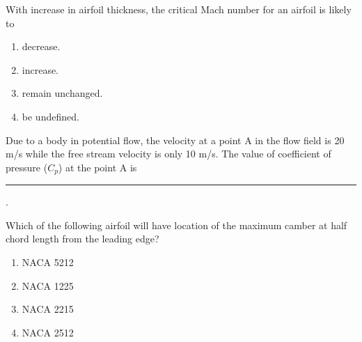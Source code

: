 \iffalse
    \author{EE24BTECH11061}
    \section{ae}
    \chapter{2016}
 \fi
\item With increase in airfoil thickness, the critical Mach number for an airfoil is likely to
\begin{multicols}{2}
    \begin{enumerate}
        \item decrease.
        \item increase.
        \item remain unchanged.
        \item be undefined.
    \end{enumerate}
\end{multicols}

\item Due to a body in potential flow, the velocity at a point A in the flow field is 20 m/s while the free stream velocity is only 10 m/s. The value of coefficient of pressure ($C_p$) at the point A is \rule{1cm}{0.15mm} .
    
\item Which of the following airfoil will have location of the maximum camber at half chord length from the leading edge?
\begin{multicols}{2}
    \begin{enumerate}
        \item NACA 5212
        \item NACA 1225
        \item NACA 2215
        \item NACA 2512
    \end{enumerate}
\end{multicols}
